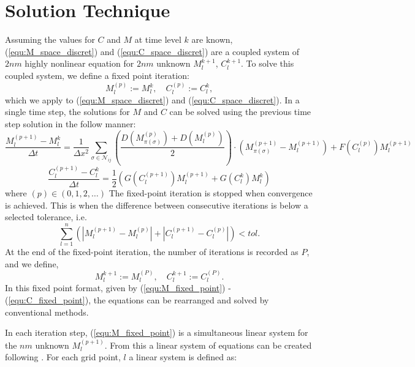 \section{Solution Technique}

Assuming the values for $C$ and $M$ at time level $k$ are known, (\ref{equ:M_space_discret}) and (\ref{equ:C_space_discret}) are a coupled system of $2nm$ highly nonlinear equation for $2nm$ unknown $M^{k+1}_{l}$, $C^{k+1}_{l}$.
To solve this coupled system, we define a fixed point iteration: 
\begin{equation}
  M^{(p)}_{l} := M^{k}_{l}, \quad C^{(p)}_{l} := C^{k}_{l},
\end{equation}
which we apply to (\ref{equ:M_space_discret}) and (\ref{equ:C_space_discret}).
In a single time step, the solutions for $M$ and $C$ can be solved using the previous time step solution in the follow manner:
\begin{equation} \label{equ:M_fixed_point}
  \frac{M^{(p+1)}_{l} - M^{k}_{l}}{\Delta t} = 
    \frac{1}{\Delta x^2} \sum_{\sigma \in \mathcal{N}_{ij}}
    \left( \frac{D(M^{(p)}_{\pi(\sigma)}) + D(M^{(p)}_{l})}{2} \right)
    \cdot \left( M^{(p+1)}_{\pi(\sigma)} - M^{(p+1)}_{l} \right)
    + F(C^{(p)}_{l}) M^{(p+1)}_{l}
\end{equation}
\begin{equation} \label{equ:C_fixed_point}
  \frac{C^{(p+1)}_{l} - C^{k}_{l}}{\Delta t} = \frac{1}{2} ( G(C^{(p+1)}_{l} ) M^{(p+1)}_{l} + G(C^{k}_{l}) M^{k}_{l} )
\end{equation}
where $(p) \in (0,1,2,\ldots)$
The fixed-point iteration is stopped when convergence is achieved.
This is when the difference between consecutive iterations is below a selected tolerance, i.e.
\begin{equation}
  \sum^{n}_{l=1} \left( \left| M^{(p+1)}_{l} - M^{(p)}_{l}\right| + \left| C^{(p+1)}_{l} - C^{(p)}_{l} \right| \right) < tol.
\end{equation}
At the end of the fixed-point iteration, the number of iterations is recorded as $P$, and we define,
\begin{equation}
  M^{k+1}_{l} := M^{(P)}_{l}, \quad C^{k+1}_{l} := C^{(P)}_{l}.
\end{equation}
In this fixed point format, given by (\ref{equ:M_fixed_point}) - (\ref{equ:C_fixed_point}), the equations can be rearranged and solved by conventional methods.

In each iteration step, (\ref{equ:M_fixed_point}) is a simultaneous linear system for the $nm$ unknown $M^{(p+1)}_{l}$.
From this a linear system of equations can be created following \cite{saad2003iterativeMethod}.
For each grid point, $l$ a linear system is defined as:

